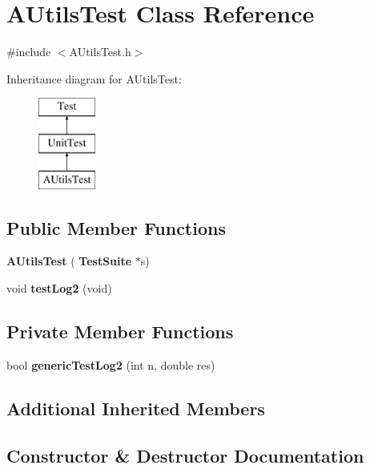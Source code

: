 \section{A\+Utils\+Test Class Reference}
\label{classAUtilsTest}


{\ttfamily \#include $<$A\+Utils\+Test.\+h$>$}

Inheritance diagram for A\+Utils\+Test\+:\begin{figure}[H]
\begin{center}
\leavevmode
\includegraphics[height=3.000000cm]{classAUtilsTest}
\end{center}
\end{figure}
\subsection*{Public Member Functions}
\begin{DoxyCompactItemize}
\item 
\textbf{ A\+Utils\+Test} (\textbf{ Test\+Suite} $\ast$s)
\item 
void \textbf{ test\+Log2} (void)
\end{DoxyCompactItemize}
\subsection*{Private Member Functions}
\begin{DoxyCompactItemize}
\item 
bool \textbf{ generic\+Test\+Log2} (int n, double res)
\end{DoxyCompactItemize}
\subsection*{Additional Inherited Members}


\subsection{Constructor \& Destructor Documentation}
\mbox{\label{classAUtilsTest_a58f82e2d0191d41e671a26030ab033d3}} 
